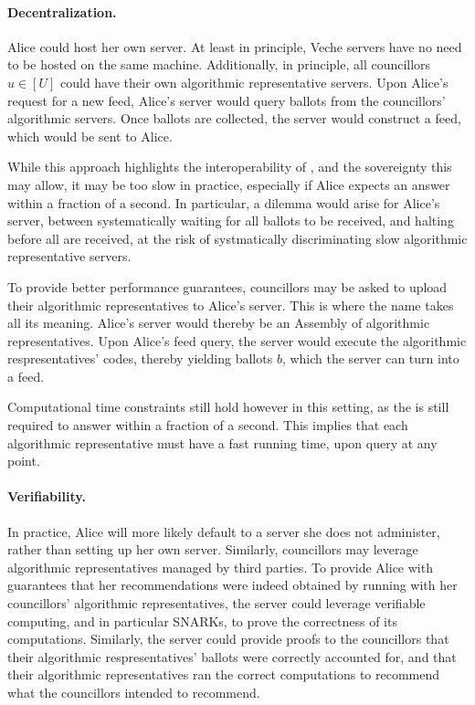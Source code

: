 \paragraph{Decentralization.}
Alice could host her own \Veche{} server.
At least in principle, 
Veche servers have no need to be hosted on the same machine.
Additionally, in principle,
all councillors $u \in [U]$ 
could have their own algorithmic representative servers.
Upon Alice's request for a new feed,
Alice's \Veche{} server would query ballots 
from the councillors' algorithmic servers.
Once ballots are collected, the \Veche{} server would construct a feed,
which would be sent to Alice.

While this approach highlights the interoperability of \Veche{},
and the sovereignty this may allow,
it may be too slow in practice,
especially if Alice expects an answer within a fraction of a second.
In particular, a dilemma would arise for Alice's \Veche{} server,
between systematically waiting for all ballots to be received,
and halting before all are received,
at the risk of systmatically discriminating 
slow algorithmic representative servers.

To provide better performance guarantees,
councillors may be asked 
to upload their algorithmic representatives 
to Alice's \Veche{} server.
This is where the name \Veche{} takes all its meaning.
Alice's \Veche{} server would thereby be 
an Assembly of algorithmic representatives.
Upon Alice's feed query, the \Veche{} server 
would execute the algorithmic respresentatives' codes,
thereby yielding ballots $b$, 
which the \Veche{} server can turn into a feed.

Computational time constraints still hold however in this setting,
as the \Veche{} is still required to answer within a fraction of a second.
This implies that each algorithmic representative must have a fast running time,
upon query at any point.

\paragraph{Verifiability.}
In practice, Alice will more likely default 
to a \Veche{} server she does not administer,
rather than setting up her own \Veche{} server.
Similarly, councillors may leverage algorithmic representatives
managed by third parties.
To provide Alice with guarantees that her recommendations
were indeed obtained by running \Veche{}
with her councillors' algorithmic representatives,
the \Veche{} server could leverage verifiable computing,
and in particular SNARKs,
to prove the correctness of its computations.
Similarly, the \Veche{} server could provide proofs to the councillors
that their algorithmic respresentatives' ballots were correctly accounted for,
and that their algorithmic representatives ran the correct computations
to recommend what the councillors intended to recommend.

